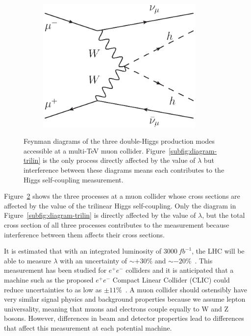 \documentclass[12pt]{article}
\begin{document}
\begin{figure}[h]
\begin{subfigure}[b]{0.3\textwidth}
		\includegraphics[width=0.9\textwidth]{diagram-4x}
		\caption{}\label{subfig:diagram-4x}
	\end{subfigure}
	\caption{Feynman diagrams of the three double-Higgs production modes accessible at a multi-TeV muon collider. Figure~\ref{subfig:diagram-trilin} is the only process directly affected by the value of $\lambda$ but interference between these diagrams means each contributes to the Higgs self-coupling measurement.}\label{fig:feyn-diags}
\end{figure}

Figure~\ref{fig:feyn-diags} shows the three processes at a muon collider whose cross sections are affected by the value of the trilinear Higgs self-coupling. Only the diagram in Figure~\ref{subfig:diagram-trilin} is directly affected by the value of $\lambda$, but the total cross section of all three processes contributes to the measurement because interference between them affects their cross sections.

It is estimated that with an integrated luminosity of $3000~fb^{-1}$, the LHC will be able to measure $\lambda$ with an uncertainty of $\sim + 30 \%$ and $\sim - 20 \%$~\cite{goertz}. This measurement has been studied for $e^+e^-$ colliders and it is anticipated that a machine such as the proposed $e^+e^-$ Compact Linear Collider (CLIC) could reduce uncertainties to as low as $\pm 11\%$~\cite{pres:jan}. A muon collider should ostensibly have very similar signal physics and background properties because we assume lepton universality, meaning that muons and electrons couple equally to W and Z bosons. However, differences in beam and detector properties lead to differences that affect this measurement at each potential machine. 
\end{document}
